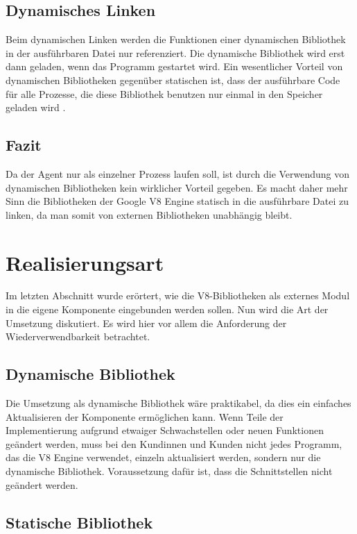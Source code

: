 \subsection{Dynamisches Linken}

Beim dynamischen Linken werden die Funktionen einer dynamischen Bibliothek in der ausführbaren Datei nur referenziert. Die dynamische
Bibliothek wird erst dann geladen, wenn das Programm gestartet wird. Ein wesentlicher Vorteil von dynamischen Bibliotheken gegenüber statischen
ist, dass der ausführbare Code für alle Prozesse, die diese Bibliothek benutzen nur einmal in den Speicher geladen wird \cite{dynLinking}.

\subsection{Fazit}

Da der Agent nur als einzelner Prozess laufen soll, ist durch die Verwendung von dynamischen Bibliotheken kein wirklicher Vorteil gegeben.
Es macht daher mehr Sinn die Bibliotheken der Google V8 Engine statisch in die ausführbare Datei zu linken, da man somit von externen Bibliotheken
unabhängig bleibt.

\section{Realisierungsart}

Im letzten Abschnitt wurde erörtert, wie die V8-Bibliotheken als externes Modul in die eigene Komponente
eingebunden werden sollen. Nun wird die Art der Umsetzung diskutiert. Es wird hier vor allem die Anforderung der Wiederverwendbarkeit
betrachtet. 

\subsection{Dynamische Bibliothek}

Die Umsetzung als dynamische Bibliothek wäre praktikabel, da dies ein einfaches Aktualisieren der Komponente ermöglichen kann.
Wenn Teile der Implementierung aufgrund etwaiger Schwachstellen oder neuen Funktionen geändert werden, muss bei den Kundinnen und Kunden 
nicht jedes Programm, das die V8 Engine verwendet, einzeln aktualisiert werden, sondern nur die dynamische Bibliothek. Voraussetzung dafür
ist, dass die Schnittstellen nicht geändert werden.

\subsection{Statische Bibliothek}

